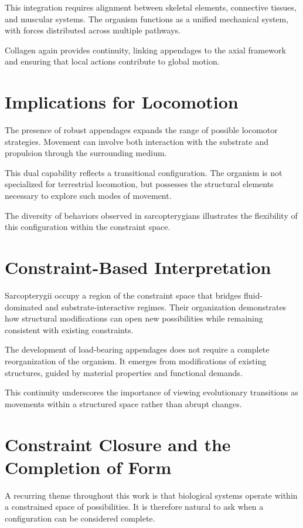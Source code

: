 \documentclass[11pt,oneside]{book}
\begin{document}
This integration requires alignment between skeletal elements, connective tissues, and muscular systems. The organism functions as a unified mechanical system, with forces distributed across multiple pathways.

Collagen again provides continuity, linking appendages to the axial framework and ensuring that local actions contribute to global motion.

\section{Implications for Locomotion}

The presence of robust appendages expands the range of possible locomotor strategies. Movement can involve both interaction with the substrate and propulsion through the surrounding medium.

This dual capability reflects a transitional configuration. The organism is not specialized for terrestrial locomotion, but possesses the structural elements necessary to explore such modes of movement.

The diversity of behaviors observed in sarcopterygians illustrates the flexibility of this configuration within the constraint space.

\section{Constraint-Based Interpretation}

Sarcopterygii occupy a region of the constraint space that bridges fluid-dominated and substrate-interactive regimes. Their organization demonstrates how structural modifications can open new possibilities while remaining consistent with existing constraints.

The development of load-bearing appendages does not require a complete reorganization of the organism. It emerges from modifications of existing structures, guided by material properties and functional demands.

This continuity underscores the importance of viewing evolutionary transitions as movements within a structured space rather than abrupt changes.

\section{Constraint Closure and the Completion of Form}

A recurring theme throughout this work is that biological systems operate within a constrained space of possibilities. It is therefore natural to ask when a configuration can be considered complete.
\end{document}
